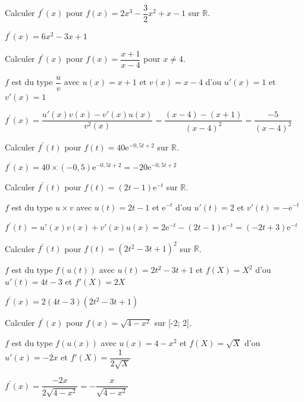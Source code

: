 \documentclass[11pt,a4paper]{article}  %
\begin{document}
\begin{enumMet}
	\item Calculer $f^{\prime}(x)$ pour $f(x)=2 x^3-\dfrac{3}{2} x^2+x-1$ sur $\mathbb{R}$. 
	\begin{corrBox}
		$f^{\prime}(x)=6x^2-3x+1$		
	\end{corrBox}
	\item Calculer $f^{\prime}(x)$ pour $f(x)=\dfrac{x+1}{x-4}$ pour $x \neq 4$.
	\begin{corrBox}
		$f$ est du type $\dfrac{u}{v}$ avec $u(x)=x+1$ et $v(x)=x-4$ d'ou $u'(x)=1$ et $v'(x)=1$
		
		$f^{\prime}(x)=\dfrac{u'(x)v(x)-v'(x)u(x)}{v^2(x)}=\dfrac{(x-4)-(x+1)}{(x-4)^2}=\dfrac{-5}{(x-4)^2}$		
	\end{corrBox}
	\item Calculer $f^{\prime}(t)$ pour $f(t)=40 \mathrm{e}^{-0,5 t+2}$ sur $\mathbb{R}$.
	\begin{corrBox}
		$f^{\prime}(x)=40\times (-0,5)\mathrm{e}^{-0,5 t+2}=-20\mathrm{e}^{-0,5 t+2}$		
	\end{corrBox} 
	\item Calculer $f^{\prime}(t)$ pour $f(t)=(2 t-1) \mathrm{e}^{-t}$ sur $\mathbb{R}$.
	\begin{corrBox}
		$f$ est du type $u\times v$ avec $u(t)=2t-1$ et $\mathrm{e}^{-t}$ d'ou $u'(t)=2$ et $v'(t)=-\mathrm{e}^{-t}$
		
		$f^{\prime}(t)=u'(x)v(x)+v'(x)u(x)=2\mathrm{e}^{-t}-(2t-1)\mathrm{e}^{-t}=(-2t+3)\mathrm{e}^{-t}$		
	\end{corrBox}
	\item Calculer $f^{\prime}(t)$ pour $f(t)=\left(2 t^2-3 t+1\right)^2$ sur $\mathbb{R}$.
	\begin{corrBox}
		$f$ est du type $f(u(t))$ avec $u(t)=2t^2-3t+1$ et $f(X)=X^2$ d'ou $u'(t)=4t-3$ et $f'(X)=2X$ 
		
		$f^{\prime}(x)=2(4t-3)(2t^2-3t+1)$		
	\end{corrBox}
	\item Calculer $f^{\prime}(x)$ pour $f(x)=\sqrt{4-x^2}$ sur [-2; 2].
	\begin{corrBox}
		$f$ est du type $f(u(x))$ avec $u(x)=4-x^2$ et $f(X)=\sqrt{X}$ d'ou $u'(x)=-2x$ et $f'(X)=\dfrac{1}{2\sqrt{X}}$ 
		
		$f^{\prime}(x)=\dfrac{-2x}{2\sqrt{4-x^2}}=-\dfrac{x}{\sqrt{4-x^2}}$		
	\end{corrBox}
\end{enumMet}
\end{document}
